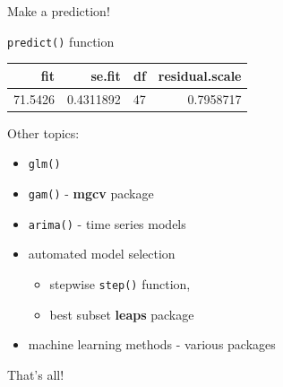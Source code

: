 \documentclass[ignorenonframetext,]{beamer}
\newenvironment{Shaded}{\begin{snugshade}}{\end{snugshade}}
\newcommand{\KeywordTok}[1]{\textcolor[rgb]{0.13,0.29,0.53}{\textbf{{#1}}}}
\newcommand{\DataTypeTok}[1]{\textcolor[rgb]{0.13,0.29,0.53}{{#1}}}
\newcommand{\StringTok}[1]{\textcolor[rgb]{0.31,0.60,0.02}{{#1}}}
\newcommand{\OtherTok}[1]{\textcolor[rgb]{0.56,0.35,0.01}{{#1}}}
\newcommand{\NormalTok}[1]{{#1}}
\begin{document}
\begin{frame}[fragile]{Make a prediction!}

\begin{block}{\texttt{predict()} function}

\begin{Shaded}
\end{Shaded}

\begin{longtable}[c]{@{}rrrr@{}}
\toprule
fit & se.fit & df & residual.scale\tabularnewline
\midrule
\endhead
71.5426 & 0.4311892 & 47 & 0.7958717\tabularnewline
\bottomrule
\end{longtable}

\end{block}

\end{frame}

\begin{frame}{Other topics:}

\begin{itemize}[<+->]
\itemsep1pt\parskip0pt
\item
  \texttt{glm()}
\item
  \texttt{gam()} - \textbf{mgcv} package
\item
  \texttt{arima()} - time series models
\item
  automated model selection

  \begin{itemize}[<+->]
  \itemsep1pt\parskip0pt
  \item
    stepwise \texttt{step()} function,
  \item
    best subset \textbf{leaps} package
  \end{itemize}
\item
  machine learning methods - various packages
\end{itemize}

That's all!

\end{frame}
\end{document}
